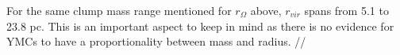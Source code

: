For the same clump mass range mentioned for $r_Ω$ above, $r_{vir}$ spans from 5.1 to 23.8 pc. This is an important aspect to keep in mind as there is no evidence for YMCs to have a proportionality between mass and radius. \cite{Bedini_2013}//